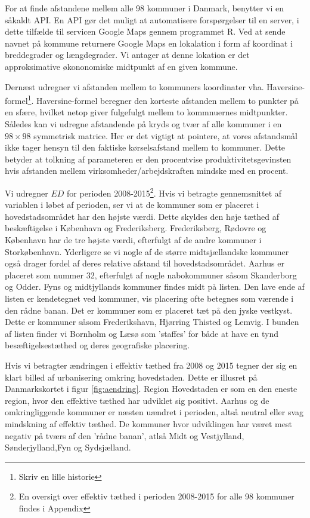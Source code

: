 \documentclass[a4paper, 12pt, titlepage]{article}
\begin{document}
For at finde afstandene mellem alle 98 kommuner i Danmark, benytter vi en såkaldt API. En API gør det muligt at automatisere forspørgelser til en server, i dette tilfælde til servicen Google Maps gennem programmet \textsf{R}. Ved at sende navnet på kommune returnere Google Maps en lokalation i form af koordinat i breddegrader og længdegrader. Vi antager at denne lokation er det approksimative økononomiske midtpunkt af en given kommune. 

Dernæst udregner vi afstanden mellem to kommuners koordinater vha. Haversine-formel\footnote{Skriv en lille historie}. Haversine-formel beregner den korteste afstanden mellem to punkter på en sfære, hvilket netop giver fulgefulgt mellem to kommnuernes midtpunkter. Således kan vi udregne afstandende på kryds og tvær af alle kommuner i en $98\times 98$ symmetrisk matrice. Her er det vigtigt at pointere, at vores afstandsmål ikke tager hensyn til den faktiske kørselsafstand mellem to kommuner. Dette betyder at tolkning af parameteren er den procentvise produktivitetsgevinsten hvis afstanden mellem virksomheder/arbejdskraften mindske med en procent. 

Vi udregner $ED$ for perioden 2008-2015\footnote{En oversigt over effektiv tæthed i perioden 2008-2015 for alle 98 kommuner findes i Appendix}. Hvis vi betragte gennemsnittet af variablen i løbet af perioden, ser vi at de kommuner som er placeret i hovedstadsområdet har den højste værdi. Dette skyldes den høje tæthed af beskæftigelse i København og Frederiksberg. Frederiksberg, Rødovre og København har de tre højste værdi, efterfulgt af de andre kommuner i Storkøbenhavn. Yderligere se vi nogle af de større midtsjællandske kommuner også drager fordel af deres relative afstand til hovedstadsområdet. Aarhus er placeret som nummer 32, efterfulgt af nogle nabokommuner såsom Skanderborg og Odder. Fyns og midtjyllands kommuner findes midt på listen. Den lave ende af listen er kendetegnet ved kommuner, vis placering ofte betegnes som værende i den rådne banan. Det er kommuner som er placeret tæt på den jyske vestkyst. Dette er kommuner såsom Frederikshavn, Hjørring Thisted og Lemvig. I bunden af listen finder vi Bornholm og Læsø som 'staffes' for både at have en tynd besæftigelsestæthed og deres geografiske placering.

Hvis vi betragter ændringen i effektiv tæthed fra 2008 og 2015 tegner der sig en klart billed af urbanisering omkring hovedstaden. Dette er illusret på Danmarkskortet i figur \ref{fig:aendring}. Region Hovedstaden er som en den eneste region, hvor den effektive tæthed har udviklet sig positivt. Aarhus og de omkringliggende kommuner er næsten uændret i perioden, altså neutral eller svag mindskning af effektiv tæthed. De kommuner hvor udviklingen har været mest negativ på tværs af den 'rådne banan', atlså Midt og Vestjylland, Sønderjylland,Fyn og Sydsjælland.
\end{document}
